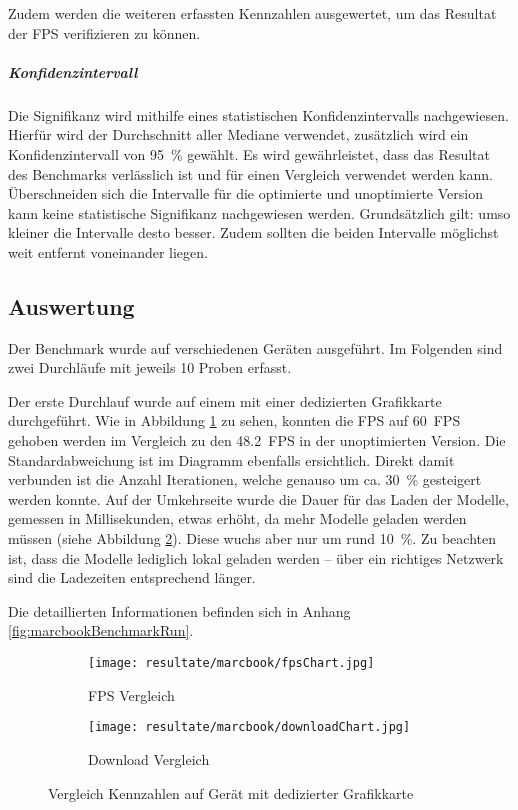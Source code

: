 Zudem werden die weiteren erfassten Kennzahlen ausgewertet, um das Resultat der \gls{FPS} verifizieren zu können.

\subparagraph{Konfidenzintervall}
Die Signifikanz wird mithilfe eines statistischen Konfidenzintervalls nachgewiesen. Hierfür wird der Durchschnitt aller Mediane verwendet, zusätzlich wird ein Konfidenzintervall von 95 \% gewählt. Es wird gewährleistet, dass das Resultat des Benchmarks verlässlich ist und für einen Vergleich verwendet werden kann. Überschneiden sich die Intervalle für die optimierte und unoptimierte Version kann keine statistische Signifikanz nachgewiesen werden. Grundsätzlich gilt: umso kleiner die Intervalle desto besser. Zudem sollten die beiden Intervalle möglichst weit entfernt voneinander liegen.

\subsection{Auswertung}
\label{chap:benchmarkResults}

Der Benchmark wurde auf verschiedenen Geräten ausgeführt. Im Folgenden sind zwei Durchläufe mit jeweils 10 Proben erfasst.

Der erste Durchlauf wurde auf einem  mit einer dedizierten Grafikkarte durchgeführt. Wie in Abbildung \ref{fig:benchmarkFpsChartMarcbook} zu sehen, konnten die \gls{FPS} auf 60 \gls{FPS} gehoben werden im Vergleich zu den 48.2 \gls{FPS} in der unoptimierten Version. Die Standardabweichung ist im Diagramm ebenfalls ersichtlich.
Direkt damit verbunden ist die Anzahl  Iterationen, welche genauso um ca. 30 \% gesteigert werden konnte. Auf der Umkehrseite wurde die Dauer für das Laden der Modelle, gemessen in Millisekunden, etwas erhöht, da mehr Modelle geladen werden müssen (siehe Abbildung \ref{fig:benchmarkDownloadChartMarcbook}). Diese wuchs aber nur um rund 10 \%. Zu beachten ist, dass die Modelle lediglich lokal geladen werden – über ein richtiges Netzwerk sind die Ladezeiten entsprechend länger.

Die detaillierten Informationen befinden sich in Anhang \ref{fig:marcbookBenchmarkRun}.

\begin{figure}[H]
  \centering
  \begin{subfigure}{.49\textwidth}
    \centering
    \texttt{[image: resultate/marcbook/fpsChart.jpg]}
    \caption{\gls{FPS} Vergleich}
    \label{fig:benchmarkFpsChartMarcbook}
  \end{subfigure}
  \begin{subfigure}{.49\textwidth}
    \centering
    \texttt{[image: resultate/marcbook/downloadChart.jpg]}
    \caption{Download Vergleich}
    \label{fig:benchmarkDownloadChartMarcbook}
  \end{subfigure}
  \caption{Vergleich Kennzahlen auf Gerät mit dedizierter Grafikkarte}
  \label{fig:benchmarkChartMarcbook}
\end{figure}

